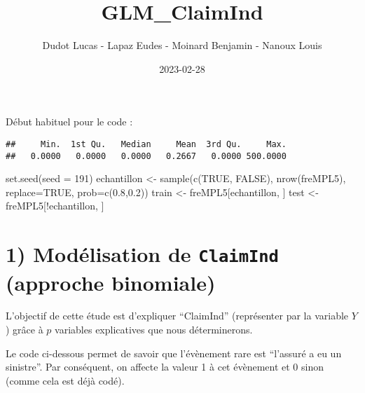 \documentclass[
]{article}
\title{GLM\_ClaimInd}
\author{Dudot Lucas - Lapaz Eudes - Moinard Benjamin - Nanoux Louis}
\date{2023-02-28}
\newenvironment{Shaded}{\begin{snugshade}}{\end{snugshade}}
\newcommand{\AttributeTok}[1]{\textcolor[rgb]{0.77,0.63,0.00}{#1}}
\newcommand{\ConstantTok}[1]{\textcolor[rgb]{0.00,0.00,0.00}{#1}}
\newcommand{\DecValTok}[1]{\textcolor[rgb]{0.00,0.00,0.81}{#1}}
\newcommand{\FloatTok}[1]{\textcolor[rgb]{0.00,0.00,0.81}{#1}}
\newcommand{\FunctionTok}[1]{\textcolor[rgb]{0.00,0.00,0.00}{#1}}
\newcommand{\NormalTok}[1]{#1}
\newcommand{\OtherTok}[1]{\textcolor[rgb]{0.56,0.35,0.01}{#1}}
\newcommand{\SpecialCharTok}[1]{\textcolor[rgb]{0.00,0.00,0.00}{#1}}
\begin{document}
\maketitle

Début habituel pour le code :

\begin{Shaded}
\end{Shaded}

\begin{verbatim}
##     Min.  1st Qu.   Median     Mean  3rd Qu.     Max. 
##   0.0000   0.0000   0.0000   0.2667   0.0000 500.0000
\end{verbatim}

\begin{Shaded}
\begin{Highlighting}[]
\FunctionTok{set.seed}\NormalTok{(}\AttributeTok{seed =} \DecValTok{191}\NormalTok{)}
\NormalTok{echantillon }\OtherTok{\textless{}{-}} \FunctionTok{sample}\NormalTok{(}\FunctionTok{c}\NormalTok{(}\ConstantTok{TRUE}\NormalTok{, }\ConstantTok{FALSE}\NormalTok{), }\FunctionTok{nrow}\NormalTok{(freMPL5), }\AttributeTok{replace=}\ConstantTok{TRUE}\NormalTok{, }\AttributeTok{prob=}\FunctionTok{c}\NormalTok{(}\FloatTok{0.8}\NormalTok{,}\FloatTok{0.2}\NormalTok{))}
\NormalTok{train  }\OtherTok{\textless{}{-}}\NormalTok{ freMPL5[echantillon, ]}
\NormalTok{test   }\OtherTok{\textless{}{-}}\NormalTok{ freMPL5[}\SpecialCharTok{!}\NormalTok{echantillon, ]}
\end{Highlighting}
\end{Shaded}

\hypertarget{moduxe9lisation-de-claimind-approche-binomiale}{%
\section{\texorpdfstring{1) Modélisation de \texttt{ClaimInd} (approche
binomiale)}{1) Modélisation de ClaimInd (approche binomiale)}}\label{moduxe9lisation-de-claimind-approche-binomiale}}

L'objectif de cette étude est d'expliquer ``ClaimInd'' (représenter par
la variable \(Y\)) grâce à \(p\) variables explicatives que nous
déterminerons.

Le code ci-dessous permet de savoir que l'évènement rare est ``l'assuré
a eu un sinistre''. Par conséquent, on affecte la valeur 1 à cet
évènement et 0 sinon (comme cela est déjà codé).
\end{document}
